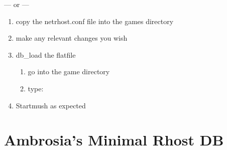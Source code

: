 \documentclass[letterpaper,10pt,english]{sphinxmanual}
\begin{document}
\sphinxAtStartPar
— or —
\begin{enumerate}
%
\item {} 
\sphinxAtStartPar
copy the netrhost.conf file into the games directory

\item {} 
\sphinxAtStartPar
make any relevant changes you wish

\item {} 
\sphinxAtStartPar
db\_load the flatfile
\begin{enumerate}
%
\item {} 
\sphinxAtStartPar
go into the game directory

\item {} 
\sphinxAtStartPar
type:

\begin{sphinxVerbatim}[commandchars=\\\{\}]
   
\end{sphinxVerbatim}

\end{enumerate}

\item {} 
\sphinxAtStartPar
Startmush as expected

\end{enumerate}


\section{Ambrosia’s Minimal Rhost DB}
\label{\detokenize{gettingstarted:ambrosia-s-minimal-rhost-db}}
\end{document}
